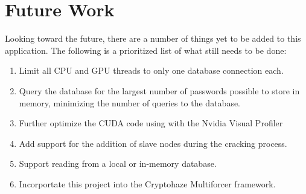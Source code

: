 \documentclass[12pt]{article}
\begin{document}
\section{Future Work}
\indent Looking toward the future, there are a number of things yet to be added to this application. The following is a prioritized list of what still needs to be done:
\begin{enumerate}
\item Limit all CPU and GPU threads to only one database connection each.
\item Query the database for the largest number of passwords possible to store in memory, minimizing the number of queries to the database.
\item Further optimize the CUDA code using with the Nvidia Visual Profiler
\item Add support for the addition of slave nodes during the cracking process.
\item Support reading from a local or in-memory database.
\item Incorportate this project into the Cryptohaze Multiforcer framework.
\end{enumerate}

\newpage

\nocite{*}





\end{document}
